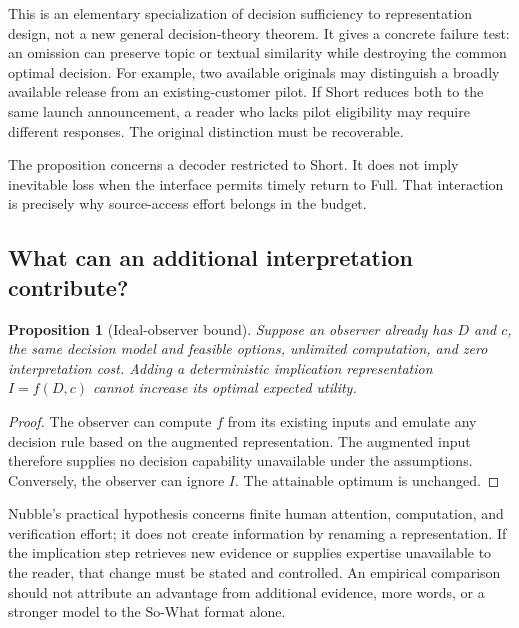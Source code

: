 \documentclass[11pt]{article}
\newtheorem{proposition}{Proposition}
\begin{document}
This is an elementary specialization of decision sufficiency to representation design, not a new general decision-theory theorem. It gives a concrete failure test: an omission can preserve topic or textual similarity while destroying the common optimal decision. For example, two available originals may distinguish a broadly available release from an existing-customer pilot. If Short reduces both to the same launch announcement, a reader who lacks pilot eligibility may require different responses. The original distinction must be recoverable.

The proposition concerns a decoder restricted to Short. It does not imply inevitable loss when the interface permits timely return to Full. That interaction is precisely why source-access effort belongs in the budget.

\subsection{What can an additional interpretation contribute?}

\begin{proposition}[Ideal-observer bound]

Suppose an observer already has $D$ and $c$, the same decision model and feasible options, unlimited computation, and zero interpretation cost. Adding a deterministic implication representation $I=f(D,c)$ cannot increase its optimal expected utility.

\end{proposition}

\begin{proof}

The observer can compute $f$ from its existing inputs and emulate any decision rule based on the augmented representation. The augmented input therefore supplies no decision capability unavailable under the assumptions. Conversely, the observer can ignore $I$. The attainable optimum is unchanged.

\end{proof}

Nubble's practical hypothesis concerns finite human attention, computation, and verification effort; it does not create information by renaming a representation. If the implication step retrieves new evidence or supplies expertise unavailable to the reader, that change must be stated and controlled. An empirical comparison should not attribute an advantage from additional evidence, more words, or a stronger model to the So-What format alone.
\end{document}
